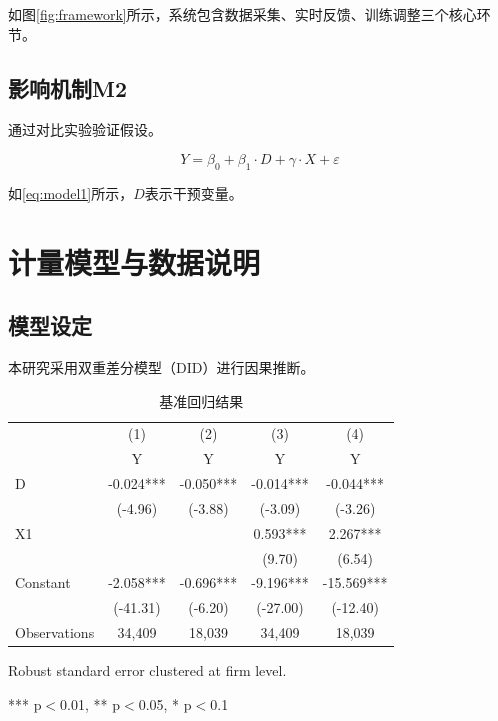 \documentclass[
  degree=master,
  degreetype=profession,
  bibtype=numeric
]{gzsu_thesis}
\begin{document}
如图\cref{fig:framework}所示，系统包含数据采集、实时反馈、训练调整三个核心环节。

\section{影响机制M2}

通过对比实验验证假设。

\begin{equation}\label{eq:model1}
  Y = \beta_0 + \beta_1 \cdot D + \gamma \cdot X + \varepsilon
\end{equation}

如\cref{eq:model1}所示，$D$表示干预变量。

\chapter{计量模型与数据说明}

\section{模型设定}

本研究采用双重差分模型（DID）进行因果推断。

\begin{table}[htbp]
  \centering
  \caption{基准回归结果}
  \label{tab:baseline}
  \begin{threeparttable}
    \begin{tabular}{l*{4}{c}}
      \toprule
      & (1) & (2) & (3) & (4) \\
      & Y & Y & Y & Y \\ \midrule
      D & -0.024*** & -0.050*** & -0.014*** & -0.044*** \\
         & (-4.96) & (-3.88) & (-3.09) & (-3.26) \\
      X1 &  &  & 0.593*** & 2.267*** \\
         &  &  & (9.70) & (6.54) \\
      Constant & -2.058*** & -0.696*** & -9.196*** & -15.569*** \\
         & (-41.31) & (-6.20) & (-27.00) & (-12.40) \\
      Observations & 34,409 & 18,039 & 34,409 & 18,039 \\ \bottomrule
    \end{tabular}
    \begin{tablenotes}
      \footnotesize
      \item[a] Robust standard error clustered at firm level.
      \item[b] *** p$<$0.01, ** p$<$0.05, * p$<$0.1
    \end{tablenotes}
  \end{threeparttable}
\end{table}
\end{document}
